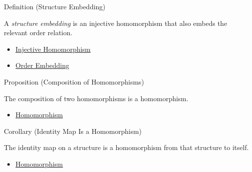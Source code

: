 \begin{definitionbox}{Definition (Structure Embedding)}
\begin{definition}
\label{def:structure-embedding}
A \emph{structure embedding} is an injective homomorphism that also embeds the
relevant order relation.
\end{definition}
\end{definitionbox}

\begin{dependencies}
\begin{itemize}
  \item \hyperref[def:injective-homomorphism]{Injective Homomorphism}
  \item \hyperref[def:abstract-order-embedding]{Order Embedding}
\end{itemize}
\end{dependencies}

\begin{propositionbox}{Proposition (Composition of Homomorphisms)}
\begin{proposition}
\label{prop:composition-of-homomorphisms}
The composition of two homomorphisms is a homomorphism.
\end{proposition}
\end{propositionbox}

\begin{dependencies}
\begin{itemize}
  \item \hyperref[def:homomorphism]{Homomorphism}
\end{itemize}
\end{dependencies}

\begin{corollarybox}{Corollary (Identity Map Is a Homomorphism)}
\begin{corollary}
\label{cor:identity-map-is-homomorphism}
The identity map on a structure is a homomorphism from that structure to
itself.
\end{corollary}
\end{corollarybox}

\begin{dependencies}
\begin{itemize}
  \item \hyperref[def:homomorphism]{Homomorphism}
\end{itemize}
\end{dependencies}

